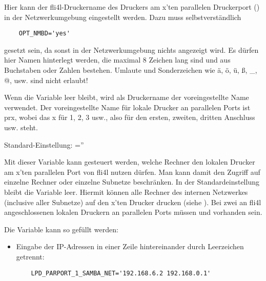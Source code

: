 \begin{description}

    Hier kann der fli4l-Druckername des Druckers am x'ten parallelen Druckerport
    () in der Netzwerkumgebung
    eingestellt werden. Dazu muss selbstverständlich

\begin{example}
\begin{verbatim}
    OPT_NMBD='yes'
\end{verbatim}
\end{example}

    gesetzt sein, da sonst in der Netzwerkumgebung nichts angezeigt wird.
    Es dürfen hier Namen hinterlegt werden, die maximal 8 Zeichen lang sind und
    aus Buchstaben oder Zahlen bestehen. Umlaute und Sonderzeichen wie ä, ö, ü,
    ß, \_, @, usw. sind nicht erlaubt!

    Wenn die Variable leer bleibt, wird als Druckername der
    voreingestellte Name verwendet. Der voreingestellte Name für lokale Drucker
    an parallelen Ports ist prx, wobei das x für 1, 2, 3 usw., also für den
    ersten, zweiten, dritten Anschluss usw. steht.

    Standard-Einstellung: =''



    Mit dieser Variable kann gesteuert werden, welche Rechner den lokalen
    Drucker am x'ten parallelen Port von fli4l nutzen dürfen. Man kann damit den
    Zugriff auf einzelne Rechner oder einzelne Subnetze beschränken. In der
    Standardeinstellung bleibt die Variable leer. Hiermit können alle Rechner
    des internen Netzwerkes (inclusive aller Subnetze) auf den x'ten Drucker
    drucken (siehe ). Bei zwei an fli4l
    angeschlossenen lokalen Druckern an parallelen Ports müssen
    \textbf{} und
    \textbf{} vorhanden sein.

    Die Variable kann so gefüllt werden:

\begin{itemize}
\item Eingabe der IP-Adressen in einer Zeile hintereinander durch Leerzeichen
      getrennt:

\begin{example}
\begin{verbatim}
    LPD_PARPORT_1_SAMBA_NET='192.168.6.2 192.168.0.1'
\end{verbatim}
\end{example}


\end{itemize}
\end{description}
